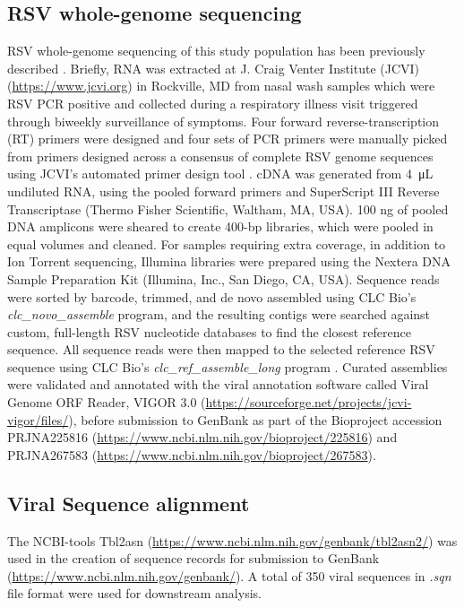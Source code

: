 \documentclass{article} %
\begin{document}
\subsection{RSV whole-genome sequencing}
RSV whole-genome sequencing of this study population has been previously described 
\citep{schobel_respiratory_2016}.
Briefly, RNA was extracted at J. Craig Venter Institute (JCVI) (\url{https://www.jcvi.org}) in Rockville, MD from nasal wash samples which were RSV PCR positive and collected during a respiratory illness visit triggered through biweekly surveillance of symptoms. 
Four forward reverse-transcription (RT) primers were designed and four sets of PCR primers were manually picked from primers designed across a consensus of complete RSV genome sequences using JCVI’s automated primer design tool
\citep{li_automated_2012}.
cDNA was generated from \SI{4}{\micro\liter}  undiluted RNA, using the pooled forward primers and SuperScript III Reverse Transcriptase (Thermo Fisher Scientific, Waltham, MA, USA). 
100 ng of pooled DNA amplicons were sheared to create 400-bp libraries, which were pooled in equal volumes and cleaned. 
For samples requiring extra coverage, in addition to Ion Torrent sequencing, Illumina libraries were prepared using the Nextera DNA Sample Preparation Kit (Illumina, Inc., San Diego, CA, USA). 
Sequence reads were sorted by barcode, trimmed, and de novo assembled using CLC Bio's \textit{clc\_novo\_assemble} program, and the resulting contigs were searched against custom, full-length RSV nucleotide databases to find the closest reference sequence. 
All sequence reads were then mapped to the selected reference RSV sequence using CLC Bio's \textit{clc\_ref\_assemble\_long} program 
\citep{bioWhite2016}.
Curated assemblies were validated and annotated with the viral annotation software called Viral Genome ORF Reader, VIGOR 3.0 (\url{https://sourceforge.net/projects/jcvi-vigor/files/}), before submission to GenBank as part of the Bioproject accession PRJNA225816 (\url{https://www.ncbi.nlm.nih.gov/bioproject/225816})
\citep{wang_vigor_2012} 
and PRJNA267583 (\url{https://www.ncbi.nlm.nih.gov/bioproject/267583}).

\subsection{Viral Sequence alignment}
The NCBI-tools Tbl2asn (\url{https://www.ncbi.nlm.nih.gov/genbank/tbl2asn2/})
was used in the creation of sequence records for submission to GenBank (\url{https://www.ncbi.nlm.nih.gov/genbank/}).
A total of 350 viral sequences in \textit{.sqn} file format were used for downstream analysis.
\end{document}
